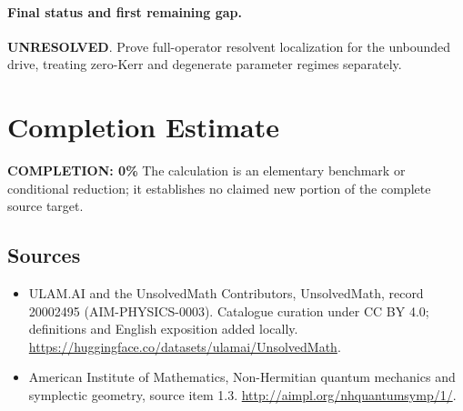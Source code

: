 \documentclass[11pt]{article}
\begin{document}
\paragraph{Final status and first remaining gap.}
\textbf{UNRESOLVED}. Prove full-operator resolvent localization for the unbounded drive, treating zero-Kerr and degenerate parameter regimes separately.

\section{Completion Estimate}
\noindent\textbf{COMPLETION: 0\%}
The calculation is an elementary benchmark or conditional reduction; it establishes no claimed new portion of the complete source target.

\subsection{Sources}
\begin{itemize}
\item[\hypertarget{source:20002495:1}{S1}] ULAM.AI and the UnsolvedMath Contributors, UnsolvedMath, record 20002495 (AIM-PHYSICS-0003). Catalogue curation under CC BY 4.0; definitions and English exposition added locally.
\url{https://huggingface.co/datasets/ulamai/UnsolvedMath}.
\item[\hypertarget{source:20002495:2}{S2}] American Institute of Mathematics, Non-Hermitian quantum mechanics and symplectic geometry, source item 1.3.
\url{http://aimpl.org/nhquantumsymp/1/}.
\end{itemize}
\label{end:20002495}
\end{document}
